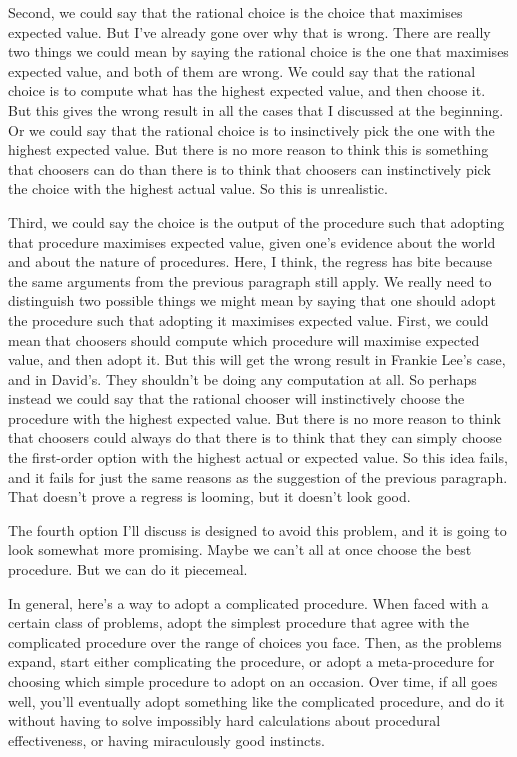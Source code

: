 \documentclass[
  10pt,
  letterpaper,
  DIV=11,
  numbers=noendperiod,
  twoside]{scrartcl}
\begin{document}
Second, we could say that the rational choice is the choice that
maximises expected value. But I've already gone over why that is wrong.
There are really two things we could mean by saying the rational choice
is the one that maximises expected value, and both of them are wrong. We
could say that the rational choice is to compute what has the highest
expected value, and then choose it. But this gives the wrong result in
all the cases that I discussed at the beginning. Or we could say that
the rational choice is to insinctively pick the one with the highest
expected value. But there is no more reason to think this is something
that choosers can do than there is to think that choosers can
instinctively pick the choice with the highest actual value. So this is
unrealistic.

Third, we could say the choice is the output of the procedure such that
adopting that procedure maximises expected value, given one's evidence
about the world and about the nature of procedures. Here, I think, the
regress has bite because the same arguments from the previous paragraph
still apply. We really need to distinguish two possible things we might
mean by saying that one should adopt the procedure such that adopting it
maximises expected value. First, we could mean that choosers should
compute which procedure will maximise expected value, and then adopt it.
But this will get the wrong result in Frankie Lee's case, and in
David's. They shouldn't be doing any computation at all. So perhaps
instead we could say that the rational chooser will instinctively choose
the procedure with the highest expected value. But there is no more
reason to think that choosers could always do that there is to think
that they can simply choose the first-order option with the highest
actual or expected value. So this idea fails, and it fails for just the
same reasons as the suggestion of the previous paragraph. That doesn't
prove a regress is looming, but it doesn't look good.

The fourth option I'll discuss is designed to avoid this problem, and it
is going to look somewhat more promising. Maybe we can't all at once
choose the best procedure. But we can do it piecemeal.

In general, here's a way to adopt a complicated procedure. When faced
with a certain class of problems, adopt the simplest procedure that
agree with the complicated procedure over the range of choices you face.
Then, as the problems expand, start either complicating the procedure,
or adopt a meta-procedure for choosing which simple procedure to adopt
on an occasion. Over time, if all goes well, you'll eventually adopt
something like the complicated procedure, and do it without having to
solve impossibly hard calculations about procedural effectiveness, or
having miraculously good instincts.
\end{document}

